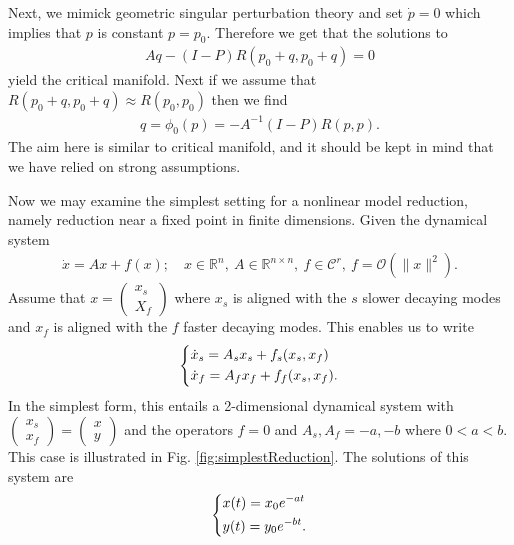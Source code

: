 Next, we mimick geometric singular perturbation theory and set $\dot{p}=0$ which implies that $p$ is constant $p=p_0$. Therefore we get that the solutions to
\begin{align}
	Aq - (I-P)R(p_0 + q, p_0 +q) =0
\end{align}
yield the critical manifold. Next if we assume that $R(p_{0}+q, p_{0}+q) \approx R(p_0, p_0)$ then we find
\begin{align}
	q = \phi_0(p) = - A^{-1}(I-P)R(p,p).
\end{align}
The aim here is similar to critical manifold, and it should be kept in mind that we have relied on strong assumptions.

Now we may examine the simplest setting for a nonlinear model reduction, namely reduction near a fixed point in finite dimensions. Given the dynamical system
\begin{align}
\dot{x} = Ax + f(x);\quad x \in \mathbb{R}^{n},\ A \in \mathbb{R}^{n\times n},\ f\in \mathcal{C}^{r},\ f=\mathcal{O}\left(\|x\|^{2}\right).
\end{align}
Assume that $x=
\begin{pmatrix}
	x_s \\ X_f
\end{pmatrix}
$ where $x_s$ is aligned with the $s$ slower decaying modes and $x_f $ is aligned with the $f$ faster decaying modes. This enables us to write
\begin{align} \label{eq9:approx_inert_mfd}
	\begin{dcases}
		\dot{x}_s = A_{s}x_{s} + f_s(x_s, x_f) \\
		\dot{x}_f = A_{f}x_{f} + f_f(x_s, x_f). 
	\end{dcases}
\end{align}
In the simplest form, this entails a 2-dimensional dynamical system with $
\begin{pmatrix}
	x_s \\ x_f
\end{pmatrix}
=
\begin{pmatrix}
	x \\y
\end{pmatrix}
$ and the operators $f=0$ and $A_s,A_f = -a,-b$ where $0<a<b$. This case is illustrated in Fig. \ref{fig:simplestReduction}. The solutions of this system are
\begin{align}
	\begin{dcases}
		x(t) = x_0 e^{-at} \\
		y(t) = y_0 e^{-bt}.
	\end{dcases}
\end{align}
